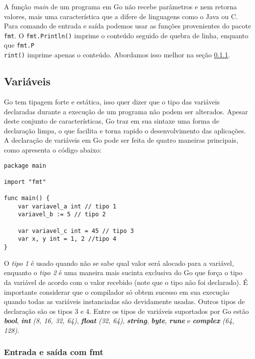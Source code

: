 \documentclass{SBCbookchapter}
\begin{document}
A função \textit{main} de um programa em Go não recebe parâmetros e nem retorna valores, mais uma característica que a difere de linguagens como o Java ou C.
Para comando de entrada e saída podemos usar as funções provenientes do pacote \texttt{fmt}. O \texttt{fmt.Println()} imprime o conteúdo seguido de quebra de linha, enquanto que \texttt{fmt.P\\rint()} imprime apenas o conteúdo. Abordamos isso melhor na seção \ref{secaodeio}.

\subsection{Variáveis}

Go tem tipagem forte e estática, isso quer dizer que o tipo das variáveis declaradas durante a execução de um programa não podem ser alterados. Apesar deste conjunto de características, Go traz em sua sintaxe uma forma de declaração limpa, o que facilita e torna rapido o desenvolvimento das aplicações. A declaração de variáveis em Go pode ser feita de quatro maneiras principais, como apresenta o código abaixo:

\begin{lstlisting}
package main

import "fmt"

func main() {
	var variavel_a int // tipo 1
	variavel_b := 5 // tipo 2
	
	var variavel_c int = 45 // tipo 3
	var x, y int = 1, 2 //tipo 4
}
\end{lstlisting}

O \textit{tipo 1} é usado quando não se sabe qual valor será alocado para a variável, enquanto o \textit{tipo 2} é uma maneira mais sucinta exclusiva do Go que força o tipo da variável de acordo com o valor recebido (note que o tipo não foi declarado). É importante considerar que o compilador só obtem sucesso em sua execução quando todas as variáveis instanciadas são devidamente usadas. Outros tipos de declaração são os tipos 3 e 4. Entre os tipos de variáveis suportados por Go estão \textbf{\textit{bool}}, \textbf{\textit{int}} \textit{(8, 16, 32, 64)}, \textbf{\textit{float}} \textit{(32, 64)}, \textbf{\textit{string}}, \textbf{\textit{byte}}, \textbf{\textit{rune}} e \textbf{\textit{complex}} \textit{(64, 128)}.

\subsubsection{Entrada e saída com fmt}
\label{secaodeio}
\end{document}
